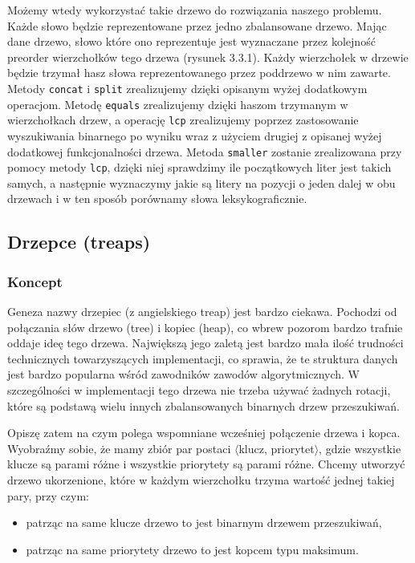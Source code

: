 \documentclass[declaration,shortabstract]{iithesis}
\theoremstyle{definition} \newtheorem{definition}{Definicja}[chapter]
\theoremstyle{remark} \newtheorem{remark}[definition]{Obserwacja}
\theoremstyle{plain} \newtheorem{theorem}[definition]{Twierdzenie}
\theoremstyle{remark} \newtheorem{example}{Przykład}[definition]
\theoremstyle{plain} \newtheorem{lemma}[definition]{Lemat}
\begin{document}
Możemy wtedy wykorzystać takie drzewo do rozwiązania naszego problemu. Każde słowo będzie reprezentowane przez jedno zbalansowane drzewo. Mając dane drzewo, słowo które ono reprezentuje jest wyznaczane przez kolejność preorder wierzchołków tego drzewa (rysunek 3.3.1). Każdy wierzchołek w drzewie będzie trzymał hasz słowa reprezentowanego przez poddrzewo w nim zawarte. Metody \texttt{concat} i \texttt{split} zrealizujemy dzięki opisanym wyżej dodatkowym operacjom. Metodę \texttt{equals} zrealizujemy dzięki haszom trzymanym w wierzchołkach drzew, a operację \texttt{lcp} zrealizujemy poprzez zastosowanie wyszukiwania binarnego po wyniku wraz z użyciem drugiej z opisanej wyżej dodatkowej funkcjonalności drzewa. Metoda \texttt{smaller} zostanie zrealizowana przy pomocy metody \texttt{lcp}, dzięki niej sprawdzimy ile początkowych liter jest takich samych, a następnie wyznaczymy jakie są litery na pozycji o jeden dalej w obu drzewach i w ten sposób porównamy słowa leksykograficznie.

\subsection{Drzepce (treaps)}

\subsubsection{Koncept}

Geneza nazwy drzepiec (z angielskiego treap) jest bardzo ciekawa. Pochodzi od połączania słów drzewo (tree) i kopiec (heap), co wbrew pozorom bardzo trafnie oddaje ideę tego drzewa. Największą jego zaletą jest bardzo mała ilość trudności technicznych towarzyszących implementacji, co sprawia, że te struktura danych jest bardzo popularna wśród zawodników zawodów algorytmicznych. W szczególności w implementacji tego drzewa nie trzeba używać żadnych rotacji, które są podstawą wielu innych zbalansowanych binarnych drzew przeszukiwań.

Opiszę zatem na czym polega wspomniane wcześniej połączenie drzewa i kopca. Wyobraźmy sobie, że mamy zbiór par postaci $\langle$klucz, priorytet$\rangle$, gdzie wszystkie klucze są parami różne i wszystkie priorytety są parami różne. Chcemy utworzyć drzewo ukorzenione, które w każdym wierzchołku trzyma wartość jednej takiej pary, przy czym:
\begin{itemize}
    \item patrząc na same klucze drzewo to jest binarnym drzewem przeszukiwań,
    \item patrząc na same priorytety drzewo to jest kopcem typu maksimum.
\end{itemize}
\end{document}
